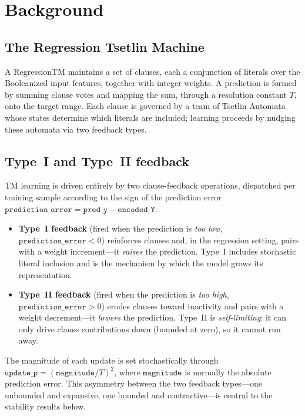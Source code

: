 \section{Background}
\label{sec:background}

\subsection{The Regression Tsetlin Machine}

A RegressionTM maintains a set of clauses, each a conjunction of literals over the
Booleanized input features, together with integer weights. A prediction is formed by
summing clause votes and mapping the sum, through a resolution constant $T$, onto the
target range. Each clause is governed by a team of Tsetlin Automata whose states
determine which literals are included; learning proceeds by nudging these automata via
two feedback types.

\subsection{Type~I and Type~II feedback}
\label{sec:feedback}

TM learning is driven entirely by two clause-feedback operations, dispatched per training
sample according to the sign of the prediction error
$\texttt{prediction\_error} = \texttt{pred\_y} - \texttt{encoded\_Y}$:

\begin{itemize}
  \item \textbf{Type~I feedback} (fired when the prediction is \emph{too low},
    $\texttt{prediction\_error} < 0$) reinforces clauses and, in the regression setting,
    pairs with a weight increment---it \emph{raises} the prediction. Type~I includes
    stochastic literal inclusion and is the mechanism by which the model grows its
    representation.
  \item \textbf{Type~II feedback} (fired when the prediction is \emph{too high},
    $\texttt{prediction\_error} > 0$) erodes clauses toward inactivity and pairs with a
    weight decrement---it \emph{lowers} the prediction. Type~II is \emph{self-limiting}:
    it can only drive clause contributions down (bounded at zero), so it cannot run away.
\end{itemize}

The magnitude of each update is set stochastically through
$\texttt{update\_p} = (\texttt{magnitude}/T)^2$, where $\texttt{magnitude}$ is normally
the absolute prediction error. This asymmetry between the two feedback types---one
unbounded and expansive, one bounded and contractive---is central to the stability
results below.
